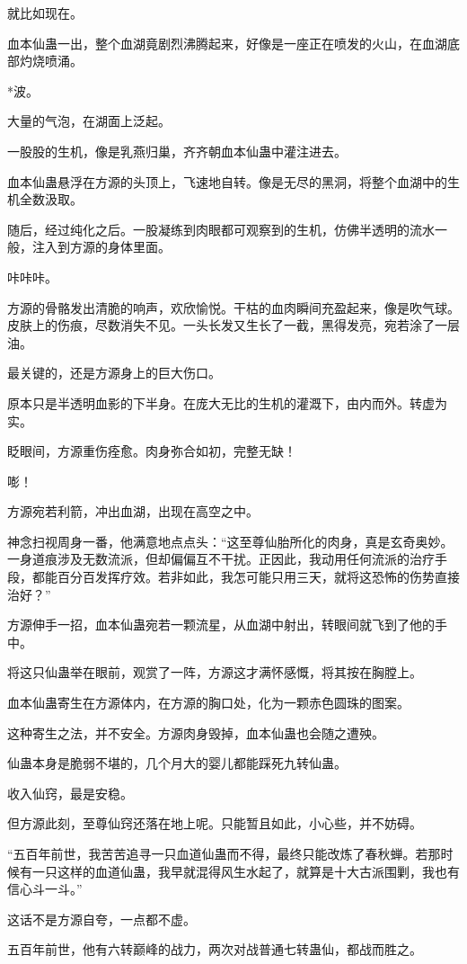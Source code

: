 \begin{this_body}
就比如现在。

血本仙蛊一出，整个血湖竟剧烈沸腾起来，好像是一座正在喷发的火山，在血湖底部灼烧喷涌。

*波。

大量的气泡，在湖面上泛起。

一股股的生机，像是乳燕归巢，齐齐朝血本仙蛊中灌注进去。

血本仙蛊悬浮在方源的头顶上，飞速地自转。像是无尽的黑洞，将整个血湖中的生机全数汲取。

随后，经过纯化之后。一股凝练到肉眼都可观察到的生机，仿佛半透明的流水一般，注入到方源的身体里面。

咔咔咔。

方源的骨骼发出清脆的响声，欢欣愉悦。干枯的血肉瞬间充盈起来，像是吹气球。皮肤上的伤痕，尽数消失不见。一头长发又生长了一截，黑得发亮，宛若涂了一层油。

最关键的，还是方源身上的巨大伤口。

原本只是半透明血影的下半身。在庞大无比的生机的灌溉下，由内而外。转虚为实。

眨眼间，方源重伤痊愈。肉身弥合如初，完整无缺！

嘭！

方源宛若利箭，冲出血湖，出现在高空之中。

神念扫视周身一番，他满意地点点头：“这至尊仙胎所化的肉身，真是玄奇奥妙。一身道痕涉及无数流派，但却偏偏互不干扰。正因此，我动用任何流派的治疗手段，都能百分百发挥疗效。若非如此，我怎可能只用三天，就将这恐怖的伤势直接治好？”

方源伸手一招，血本仙蛊宛若一颗流星，从血湖中射出，转眼间就飞到了他的手中。

将这只仙蛊举在眼前，观赏了一阵，方源这才满怀感慨，将其按在胸膛上。

血本仙蛊寄生在方源体内，在方源的胸口处，化为一颗赤色圆珠的图案。

这种寄生之法，并不安全。方源肉身毁掉，血本仙蛊也会随之遭殃。

仙蛊本身是脆弱不堪的，几个月大的婴儿都能踩死九转仙蛊。

收入仙窍，最是安稳。

但方源此刻，至尊仙窍还落在地上呢。只能暂且如此，小心些，并不妨碍。

“五百年前世，我苦苦追寻一只血道仙蛊而不得，最终只能改炼了春秋蝉。若那时候有一只这样的血道仙蛊，我早就混得风生水起了，就算是十大古派围剿，我也有信心斗一斗。”

这话不是方源自夸，一点都不虚。

五百年前世，他有六转巅峰的战力，两次对战普通七转蛊仙，都战而胜之。


\end{this_body}
